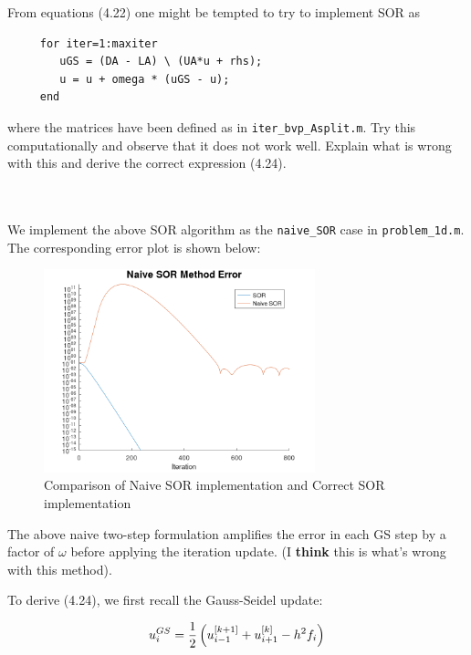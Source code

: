 From equations (4.22) one might be tempted to try to implement SOR as
\begin{verbatim}
     for iter=1:maxiter
        uGS = (DA - LA) \ (UA*u + rhs);
        u = u + omega * (uGS - u);
     end
\end{verbatim}

where the matrices have been defined as in \verb+iter_bvp_Asplit.m+. Try this computationally and observe that it does
not work well. Explain what is wrong with this and derive the correct expression (4.24).

\begin{solution}\ \\\\
    We implement the above SOR algorithm as the \texttt{naive\_SOR} case in \texttt{problem\_1d.m}. The corresponding
    error plot is shown below:

    \begin{figure}[h]
        \centering
        \includegraphics[width=0.7\textwidth]{problem_1d_naive_sor_matrix_splitting_error_800_iterations.png}
        \caption{Comparison of Naive SOR implementation and Correct SOR implementation}
    \end{figure}

    The above naive two-step formulation amplifies the error in each GS step by a factor of $\omega$ before applying
    the iteration update. (I \textbf{think} this is what's wrong with this method).

    To derive (4.24), we first recall the Gauss-Seidel update:

    \begin{equation}
        u_i^{GS} = \frac{1}{2} \left( u_{i-1}^{[k+1]} + u_{i+1}^{[k]} - h^2 f_i \right) \\
    \end{equation}


\end{solution}
